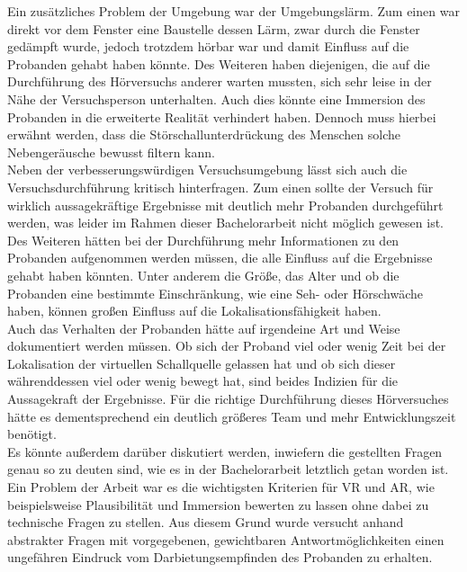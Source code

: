 Ein zusätzliches Problem der Umgebung war der Umgebungslärm. Zum einen war direkt vor dem Fenster eine Baustelle dessen Lärm, zwar durch die Fenster gedämpft wurde, jedoch trotzdem hörbar war und damit Einfluss auf die Probanden gehabt haben könnte. Des Weiteren haben diejenigen, die auf die Durchführung des Hörversuchs anderer warten mussten, sich sehr leise in der Nähe der Versuchsperson unterhalten. Auch dies könnte eine Immersion des Probanden in die erweiterte Realität verhindert haben. Dennoch muss hierbei erwähnt werden, dass die Störschallunterdrückung des Menschen solche Nebengeräusche bewusst filtern kann. \\

Neben der verbesserungswürdigen Versuchsumgebung lässt sich auch die Versuchsdurchführung kritisch hinterfragen. Zum einen sollte der Versuch für wirklich aussagekräftige Ergebnisse mit deutlich mehr Probanden durchgeführt werden, was leider im Rahmen dieser Bachelorarbeit nicht möglich gewesen ist. \\ 

Des Weiteren hätten bei der Durchführung mehr Informationen zu den Probanden aufgenommen werden müssen, die alle Einfluss auf die Ergebnisse gehabt haben könnten. Unter anderem die Größe, das Alter und ob die Probanden eine bestimmte Einschränkung, wie eine Seh- oder Hörschwäche haben, können großen Einfluss auf die Lokalisationsfähigkeit haben. \\

Auch das Verhalten der Probanden hätte auf irgendeine Art und Weise dokumentiert werden müssen. Ob sich der Proband viel oder wenig Zeit bei der Lokalisation der virtuellen Schallquelle gelassen hat und ob sich dieser währenddessen viel oder wenig bewegt hat, sind beides Indizien für die Aussagekraft der Ergebnisse. Für die richtige Durchführung dieses Hörversuches hätte es dementsprechend ein deutlich größeres Team und mehr Entwicklungszeit benötigt. \\

Es könnte außerdem darüber diskutiert werden, inwiefern die gestellten Fragen genau so zu deuten sind, wie es in der Bachelorarbeit letztlich getan worden ist. Ein Problem der Arbeit war es die wichtigsten Kriterien für VR und AR, wie beispielsweise Plausibilität und Immersion bewerten zu lassen ohne dabei zu technische Fragen zu stellen. Aus diesem Grund wurde versucht anhand abstrakter Fragen mit vorgegebenen, gewichtbaren Antwortmöglichkeiten einen ungefähren Eindruck vom Darbietungsempfinden des Probanden zu erhalten. \\

